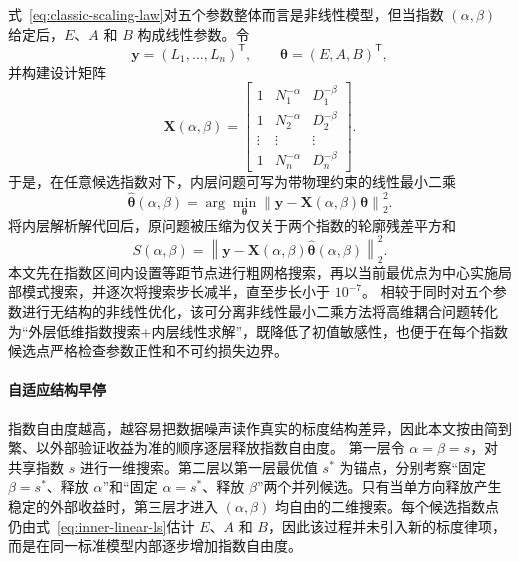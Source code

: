 \documentclass[bwprint]{gmcmthesis}
\begin{document}
式~\eqref{eq:classic-scaling-law}对五个参数整体而言是非线性模型，但当指数 $(\alpha,\beta)$ 给定后，$E$、$A$ 和 $B$ 构成线性参数。令
\begin{equation}
    \boldsymbol y=(L_1,\ldots,L_n)^{\mathsf T},\qquad
    \boldsymbol\theta=(E,A,B)^{\mathsf T},
\end{equation}
并构建设计矩阵
\begin{equation}
    \boldsymbol X(\alpha,\beta)=
    \begin{bmatrix}
        1      & N_1^{-\alpha} & D_1^{-\beta} \\
        1      & N_2^{-\alpha} & D_2^{-\beta} \\
        \vdots & \vdots        & \vdots       \\
        1      & N_n^{-\alpha} & D_n^{-\beta}
    \end{bmatrix}.
\end{equation}
于是，在任意候选指数对下，内层问题可写为带物理约束的线性最小二乘
\begin{equation}
    \widehat{\boldsymbol\theta}(\alpha,\beta)
    =\arg\min_{\boldsymbol\theta}
    \left\|\boldsymbol y-
    \boldsymbol X(\alpha,\beta)\boldsymbol\theta\right\|_2^2.
    \label{eq:inner-linear-ls}
\end{equation}
将内层解析解代回后，原问题被压缩为仅关于两个指数的轮廓残差平方和
\begin{equation}
    S(\alpha,\beta)
    =\left\|\boldsymbol y-
    \boldsymbol X(\alpha,\beta)
    \widehat{\boldsymbol\theta}(\alpha,\beta)\right\|_2^2.
    \label{eq:profile-sse}
\end{equation}
本文先在指数区间内设置等距节点进行粗网格搜索，再以当前最优点为中心实施局部模式搜索，并逐次将搜索步长减半，直至步长小于 $10^{-7}$。
相较于同时对五个参数进行无结构的非线性优化，该可分离非线性最小二乘方法将高维耦合问题转化为“外层低维指数搜索+内层线性求解”，既降低了初值敏感性，也便于在每个指数候选点严格检查参数正性和不可约损失边界。

\paragraph{自适应结构早停}

指数自由度越高，越容易把数据噪声读作真实的标度结构差异，因此本文按由简到繁、以外部验证收益为准的顺序逐层释放指数自由度。
第一层令 $\alpha=\beta=s$，对共享指数 $s$ 进行一维搜索。第二层以第一层最优值 $s^{\ast}$ 为锚点，分别考察“固定 $\beta=s^{\ast}$、释放 $\alpha$”和“固定 $\alpha=s^{\ast}$、释放 $\beta$”两个并列候选。只有当单方向释放产生稳定的外部收益时，第三层才进入 $(\alpha,\beta)$ 均自由的二维搜索。每个候选指数点仍由式~\eqref{eq:inner-linear-ls}估计 $E$、$A$ 和 $B$，因此该过程并未引入新的标度律项，而是在同一标准模型内部逐步增加指数自由度。
\end{document}
